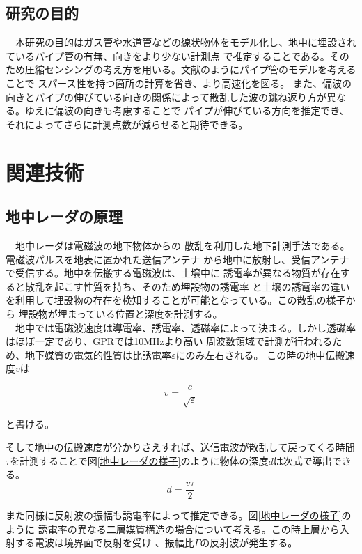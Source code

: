 \documentclass[12pt,a4paper]{jsreport}
\begin{document}
\section{研究の目的}
　本研究の目的はガス管や水道管などの線状物体をモデル化し、地中に埋設されているパイプ管の有無、向きをより少ない計測点
で推定することである。そのため圧縮センシングの考え方を用いる。文献\cite{imai}のようにパイプ管のモデルを考えることで
スパース性を持つ箇所の計算を省き、より高速化を図る。
また、偏波の向きとパイプの伸びている向きの関係によって散乱した波の跳ね返り方が異なる。ゆえに偏波の向きも考慮することで
パイプが伸びている方向を推定でき、それによってさらに計測点数が減らせると期待できる。


\chapter{関連技術}
\section{地中レーダの原理}
　地中レーダは電磁波の地下物体からの
散乱を利用した地下計測手法である。電磁波パルスを地表に置かれた送信アンテナ
から地中に放射し、受信アンテナで受信する。地中を伝搬する電磁波は、土壌中に
誘電率が異なる物質が存在すると散乱を起こす性質を持ち、そのため埋設物の誘電率
と土壌の誘電率の違いを利用して埋設物の存在を検知することが可能となっている。この散乱の様子から
埋設物が埋まっている位置と深度を計測する。
\\　地中では電磁波速度は導電率、誘電率、透磁率によって決まる。しかし透磁率はほぼ一定であり、GPRでは10MHzより高い
周波数領域で計測が行われるため、地下媒質の電気的性質は比誘電率$\varepsilon$にのみ左右される。
この時の地中伝搬速度$v$は

\begin{equation}
  v =
  \frac{c}{\sqrt{\varepsilon}} 
  \end{equation}

と書ける。


そして地中の伝搬速度が分かりさえすれば、送信電波が散乱して戻ってくる時間
$\tau$を計測することで図\ref{地中レーダの様子}のように物体の深度$d$は次式で導出できる。
\begin{equation}
  d=
  \frac{v \tau}{2} 
  \end{equation}
  
また同様に反射波の振幅も誘電率によって推定できる。図\ref{地中レーダの様子}のように
誘電率の異なる二層媒質構造の場合について考える。この時上層から入射する電波は境界面で反射を受け
、振幅比$\Gamma$の反射波が発生する。
\end{document}
